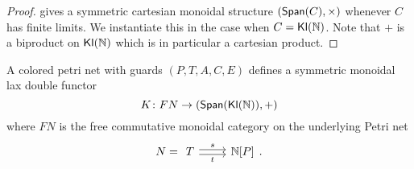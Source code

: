 \begin{proof}
\cite[Ex.\,9.2]{FramedBicats} gives a symmetric cartesian monoidal structure $(\mathsf{Span}(C),\times)$ whenever $C$ has finite limits. We instantiate this in the case when $C = \mathsf{Kl}(\mathbb{N})$. Note that $+$ is a biproduct on $\mathsf{Kl}(\mathbb{N})$ which is in particular a cartesian product.
\end{proof}
\begin{prop}\label{correspond}
    A colored petri net with guards $(P, T, A, C, E)$ defines a symmetric monoidal lax double functor
    \[
        K \colon FN \to (\mathsf{Span} (\mathsf{\mathsf{Kl}(\mathbb{N}) }), +) 
    \]
    where $FN$ is the free commutative monoidal category on the underlying Petri net \[N = \begin{tikzcd} T \ar[r, shift left = .5ex, "s"] \ar[r, shift right = .5ex, "t", swap] & \N[P] \end{tikzcd}.\]
\end{prop}

